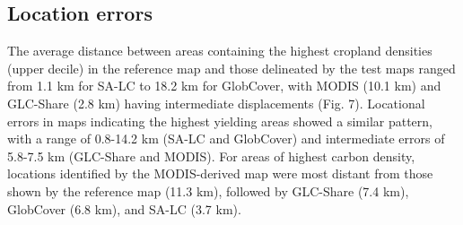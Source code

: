\documentclass[12 pt, titlepage, a4paper]{article}
\begin{document}

\vspace{-0.3 cm}
\subsection*{Location errors}
\vspace{-0.2 cm}
The average distance between areas containing the highest cropland densities (upper decile) in the reference map and those delineated by the test maps ranged from 1.1 km for SA-LC to 18.2 km for GlobCover, with MODIS (10.1 km) and GLC-Share (2.8 km) having intermediate displacements (Fig. 7). Locational errors in maps indicating the highest yielding areas showed a similar pattern, with a range of 0.8-14.2 km (SA-LC and GlobCover) and intermediate errors of 5.8-7.5 km (GLC-Share and MODIS). For areas of highest carbon density, locations identified by the MODIS-derived map were most distant from those shown by the reference map (11.3 km), followed by GLC-Share (7.4 km), GlobCover (6.8 km), and SA-LC (3.7 km).   

\end{document}
